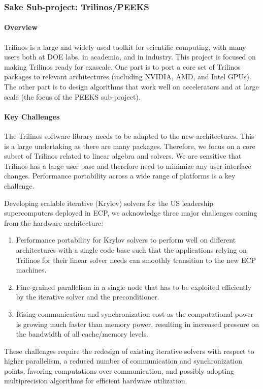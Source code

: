 \subsubsection{ Sake Sub-project: Trilinos/PEEKS} \label{subsubsect:trilinos}
\paragraph{Overview} 
Trilinos is a large and widely used toolkit for scientific computing, with many users both at DOE labs, in academia, and in industry. 
This project is focused on making Trilinos ready for exascale. One part is to port a core set of Trilinos packages to relevant architectures 
(including NVIDIA, AMD, and Intel GPUs). The other part is to design algorithms that work well on accelerators and at large scale (the focus of 
the PEEKS sub-project).


\paragraph{Key  Challenges}
The Trilinos software library needs to be adapted to the new architectures. This is a large undertaking as there are many packages. Therefore, we focus on a core subset of Trilinos related to linear algebra and solvers. We are sensitive that Trilinos has a large user base and therefore need to minimize any user interface changes. Performance portability across a wide range of platforms is a key challenge.

Developing scalable iterative (Krylov) solvers for the US leadership supercomputers 
deployed in ECP, we acknowledge three major challenges coming from the hardware 
architecture:
\begin{enumerate}
\item 
Performance portability for Krylov solvers to perform well on different architectures with a single code base
such that the applications relying on Trilinos for their linear solver needs can smoothly transition to 
the new ECP machines.
\item 
Fine-grained parallelism in a single node that has to be exploited efficiently 
by the iterative solver and the preconditioner.
\item
Rising communication and synchronization cost as the
computational power is growing much faster than memory power, resulting in 
increased pressure on the bandwidth of all cache/memory levels.
\end{enumerate}

These challenges require the redesign of existing iterative solvers with respect 
to higher parallelism, a reduced number of 
communication and synchronization points, favoring computations over 
communication, and possibly adopting multiprecision algorithms for efficient hardware 
utilization. 


